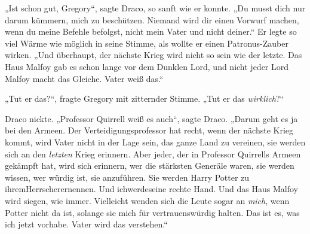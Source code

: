 „Ist schon gut, Gregory“, sagte Draco, so sanft wie er konnte. „Du musst dich nur darum kümmern, mich zu beschützen. Niemand wird dir einen Vorwurf machen, wenn du meine Befehle befolgst, nicht mein Vater und nicht deiner.“ Er legte so viel Wärme wie möglich in seine Stimme, als wollte er einen Patronus-Zauber wirken. „Und überhaupt, der nächste Krieg wird nicht so sein wie der letzte. Das Haus Malfoy gab es schon lange vor dem Dunklen Lord, und nicht jeder Lord Malfoy macht das Gleiche. Vater weiß das.“

„Tut er das?“, fragte Gregory mit zitternder Stimme. „Tut er das \emph{wirklich}?“

Draco nickte. „Professor Quirrell weiß es auch“, sagte Draco. „Darum geht es ja bei den Armeen. Der Verteidigungsprofessor hat recht, wenn der nächste Krieg kommt, wird Vater nicht in der Lage sein, das ganze Land zu vereinen, sie werden sich an den \emph{letzten} Krieg erinnern. Aber jeder, der in Professor Quirrells Armeen gekämpft hat, wird sich erinnern, wer die stärksten Generäle waren, sie werden wissen, wer würdig ist, sie anzuführen. Sie werden Harry Potter zu ihremHerrscherernennen. Und ichwerdeseine rechte Hand. Und das Haus Malfoy wird siegen, wie immer. Vielleicht wenden sich die Leute sogar an \emph{mich}, wenn Potter nicht da ist, solange sie mich für vertrauenswürdig halten. Das ist es, was ich jetzt vorhabe. Vater wird das verstehen.“

